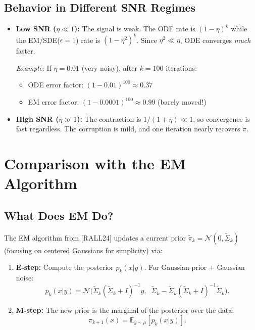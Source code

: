 \documentclass[11pt, a4paper]{article}
\theoremstyle{definition}
\begin{document}
\subsection{Behavior in Different SNR Regimes}

\begin{itemize}
    \item \textbf{Low SNR ($\eta \ll 1$):} The signal is weak. The ODE rate is $(1-\eta)^k$ while the EM/SDE($\epsilon=1$) rate is $(1-\eta^2)^k$. Since $\eta^2 \ll \eta$, ODE converges \emph{much} faster.

    \smallskip
    \textit{Example:} If $\eta = 0.01$ (very noisy), after $k=100$ iterations:
    \begin{itemize}
        \item ODE error factor: $(1-0.01)^{100} \approx 0.37$
        \item EM error factor: $(1-0.0001)^{100} \approx 0.99$ (barely moved!)
    \end{itemize}

    \item \textbf{High SNR ($\eta \gg 1$):} The contraction is $1/(1+\eta) \ll 1$, so convergence is fast regardless. The corruption is mild, and one iteration nearly recovers $\pi$.
\end{itemize}

\section{Comparison with the EM Algorithm}

\subsection{What Does EM Do?}

The EM algorithm from [RALL24] updates a current prior $\tilde{\pi}_k = \mathcal{N}(0, \tilde{\Sigma}_k)$ (focusing on centered Gaussians for simplicity) via:

\begin{enumerate}
    \item \textbf{E-step:} Compute the posterior $p_k(x|y)$. For Gaussian prior + Gaussian noise:
    \[
        p_k(x|y) = \mathcal{N}\bigl(\tilde{\Sigma}_k(\tilde{\Sigma}_k+I)^{-1}y,\;\; \tilde{\Sigma}_k - \tilde{\Sigma}_k(\tilde{\Sigma}_k+I)^{-1}\tilde{\Sigma}_k\bigr).
    \]

    \item \textbf{M-step:} The new prior is the marginal of the posterior over the data:
    \[
        \pi_{k+1}(x) = \mathbb{E}_{y\sim\mu}[p_k(x|y)].
    \]
\end{enumerate}
\end{document}
